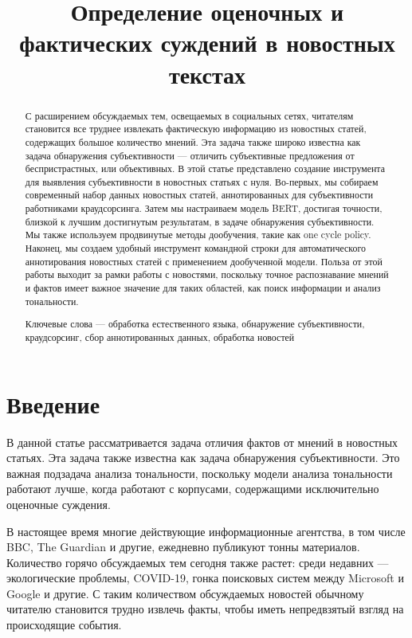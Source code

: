 \documentclass[conference]{IEEEtran}
\begin{document}
\title{Определение оценочных и фактических суждений в новостных текстах}

\author{
}

\begin{abstract}
С расширением обсуждаемых тем, освещаемых в социальных сетях, читателям становится все труднее извлекать фактическую информацию из новостных статей, содержащих большое количество мнений. Эта задача также широко известна как задача обнаружения субъективности — отличить субъективные предложения от беспристрастных, или объективных. В этой статье представлено создание инструмента для выявления субъективности в новостных статьях с нуля. Во-первых, мы собираем современный набор данных новостных статей, аннотированных для субъективности работниками краудсорсинга. Затем мы настраиваем модель BERT, достигая точности, близкой к лучшим достигнутым результатам, в задаче обнаружения субъективности. Мы также используем продвинутые методы дообучения, такие как one cycle policy. Наконец, мы создаем удобный инструмент командной строки для автоматического аннотирования новостных статей с применением дообученной модели. Польза от этой работы выходит за рамки работы с новостями, поскольку точное распознавание мнений и фактов имеет важное значение для таких областей, как поиск информации и анализ тональности.

Ключевые слова --- обработка естественного языка, обнаружение субъективности, краудсорсинг, сбор аннотированных данных, обработка новостей
\end{abstract}

\section{Введение}
В данной статье рассматривается задача отличия фактов от мнений в новостных статьях. Эта задача также известна как задача обнаружения субъективности. Это важная подзадача анализа тональности, поскольку модели анализа тональности работают лучше, когда работают с корпусами, содержащими исключительно оценочные суждения.

В настоящее время многие действующие информационные агентства, в том числе BBC, The Guardian и другие, ежедневно публикуют тонны материалов. Количество горячо обсуждаемых тем сегодня также растет: среди недавних — экологические проблемы, COVID-19, гонка поисковых систем между Microsoft и Google и другие. С таким количеством обсуждаемых новостей обычному читателю становится трудно извлечь факты, чтобы иметь непредвзятый взгляд на происходящие события.
\end{document}
